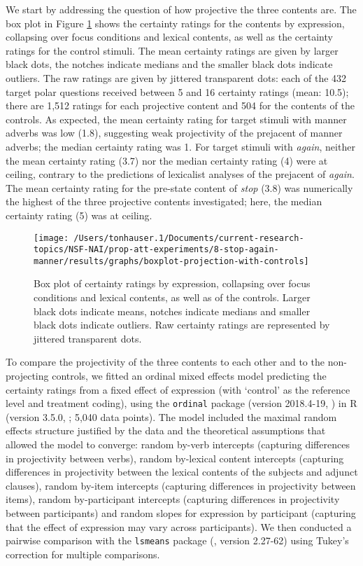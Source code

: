 \documentclass[a4paper,12pt]{article}
\newcommand{\6}{\mbox{$[\hspace*{-.6mm}[$}}
\newcommand{\9}{\mbox{$]\hspace*{-.6mm}]$}}
\begin{document}
We start by addressing the question of how projective the three contents are. The box plot in Figure \ref{f-projectivity} shows the certainty ratings for the contents by expression, collapsing over focus conditions and lexical contents, as well as the certainty ratings for the control stimuli. The mean certainty ratings are given by larger black dots, the notches indicate medians and the smaller black dots indicate outliers. The raw ratings are given by jittered transparent dots: each of the 432 target polar questions received between 5 and 16 certainty ratings (mean: 10.5); there are 1,512 ratings for each projective content and 504 for the contents of the controls. As expected, the mean certainty rating for target stimuli with manner adverbs was low (1.8), suggesting weak projectivity of the prejacent of manner adverbs; the median certainty rating was 1. For target stimuli with {\em again}, neither the mean certainty rating (3.7) nor the median certainty rating (4) were at ceiling, contrary to the predictions of lexicalist analyses of the prejacent of {\em again}. The mean certainty rating for the pre-state content of {\em stop} (3.8) was numerically the highest of the three projective contents investigated; here, the median certainty rating (5) was at ceiling.

\begin{figure}[h!]
\centering

\texttt{[image: /Users/tonhauser.1/Documents/current-research-topics/NSF-NAI/prop-att-experiments/8-stop-again-manner/results/graphs/boxplot-projection-with-controls]}

\caption{Box plot of certainty ratings by expression, collapsing over focus conditions and lexical contents, as well as of the controls. Larger black dots indicate means, notches indicate medians and smaller black dots indicate outliers. Raw certainty ratings are represented by jittered transparent dots.}
\label{f-projectivity}
\end{figure}

To compare the projectivity of the three contents to each other and to the non-projecting controls, we fitted an ordinal mixed effects model predicting the certainty ratings from a fixed effect of expression (with `control' as the reference level and treatment coding), using the \verb|ordinal| package (version 2018.4-19, \citealt{Christensen2013}) in R (version 3.5.0, \citealt{r}; 5,040 data points). The model included the maximal random effects structure justified by the data and the theoretical assumptions that allowed the model to converge: random by-verb intercepts (capturing differences in projectivity between verbs), random by-lexical content intercepts (capturing differences in projectivity between the lexical contents of the  subjects and adjunct clauses), random by-item intercepts (capturing differences in projectivity between items), random by-participant intercepts (capturing differences in projectivity between participants) and random slopes for expression by participant (capturing that the effect of expression may vary across participants). We then conducted a pairwise comparison with the \verb|lsmeans| package (\citealt{tukey}, version 2.27-62) using Tukey's correction for multiple comparisons.
\end{document}
